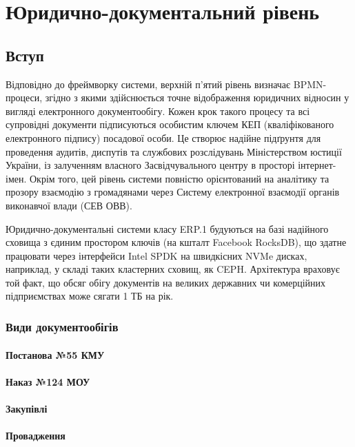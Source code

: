 \chapter{Юридично-документальний рівень}

\section{Вступ}

Відповідно до фреймворку системи, верхній п'ятий рівень визначає BPMN-процеси, згідно з якими здійснюється точне відображення юридичних відносин у вигляді електронного документообігу. Кожен крок такого процесу та всі супровідні документи підписуються особистим ключем КЕП (кваліфікованого електронного підпису) посадової особи. Це створює надійне підґрунтя для проведення аудитів, диспутів та службових розслідувань Міністерством юстиції України, із залученням власного Засвідчувального центру в просторі інтернет-імен. Окрім того, цей рівень системи повністю орієнтований на аналітику та прозору взаємодію з громадянами через Систему електронної взаємодії органів виконавчої влади (СЕВ ОВВ).

Юридично-документальні системи класу ERP.1 будуються на базі надійного сховища з єдиним простором ключів (на кшталт Facebook RocksDB), що здатне працювати через інтерфейси Intel SPDK на швидкісних NVMe дисках, наприклад, у складі таких кластерних сховищ, як CEPH. Архітектура враховує той факт, що обсяг обігу документів на великих державних чи комерційних підприємствах може сягати 1 ТБ на рік.

\subsection{Види документообігів}

\subsubsection{Постанова №55 КМУ}
\subsubsection{Наказ №124 МОУ}
\subsubsection{Закупівлі}
\subsubsection{Провадження}

